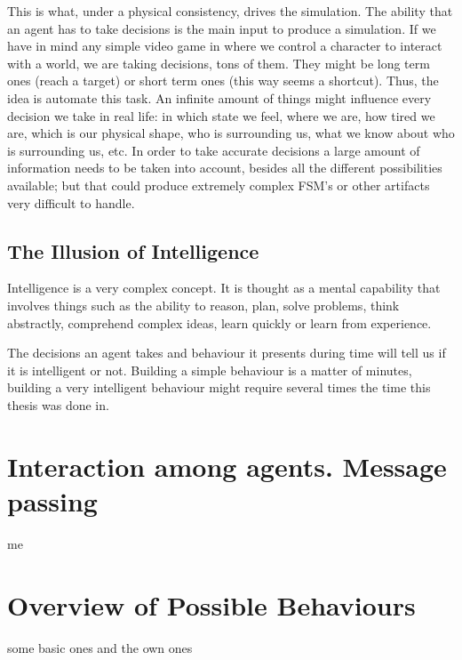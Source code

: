 This is what, under a physical consistency, drives the simulation. The ability that an agent has to take decisions is the main input to produce a simulation. If we have in mind any simple video game in where we control a character to interact with a world, we are taking decisions, tons of them. They might be long term ones (reach a target) or short term ones (this way seems a shortcut). Thus, the idea is automate this task. An infinite amount of things might influence every decision we take in real life: in which state we feel, where we are, how tired we are, which is our physical shape, who is surrounding us, what we know about who is surrounding us, etc. In order to take accurate decisions a large amount of information needs to be taken into account, besides all the different possibilities available; but that could produce extremely complex FSM's or other artifacts very difficult to handle.

\subsection{The Illusion of Intelligence}

Intelligence is a very complex concept. It is thought as a mental capability that involves things such as the ability to reason, plan, solve problems, think abstractly, comprehend complex ideas, learn quickly or learn from experience.

The decisions an agent takes and behaviour it presents during time will tell us if it is intelligent or not. Building a simple behaviour is a matter of minutes, building a very intelligent behaviour might require several times the time this thesis was done in.


\section{Interaction among agents. Message passing}

me

\section{Overview of Possible Behaviours}

some basic ones and the own ones


\ifx\isEmbedded\undefined


\pagebreak

\fi